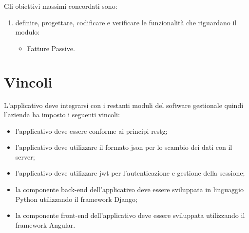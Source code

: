 Gli obiettivi massimi concordati sono:
\begin{enumerate}
	\item definire, progettare,  codificare e verificare le funzionalità che riguardano il modulo:
	\begin{itemize}
		\item Fatture Passive.
	\end{itemize}
\end{enumerate}

\section{Vincoli}
L’applicativo deve integrarsi con i restanti moduli del software gestionale quindi l'azienda ha
imposto i seguenti vincoli:
\begin{itemize}
	\item l’applicativo deve essere conforme ai principi \gls{restg};
	\item l’applicativo deve utilizzare il formato \gls{json}\cite{site:json} per lo scambio dei dati con il
	server;
	\item l’applicativo deve utilizzare \gls{jwt}\cite{site:jwt} per l’autenticazione e
	gestione della sessione;
	\item la componente back-end dell'applicativo deve essere sviluppata in linguaggio Python\cite{site:python}
	utilizzando il framework Django\cite{site:django};
	\item la componente front-end dell’applicativo deve essere sviluppata utilizzando il framework Angular\cite{site:angular}.
\end{itemize}

